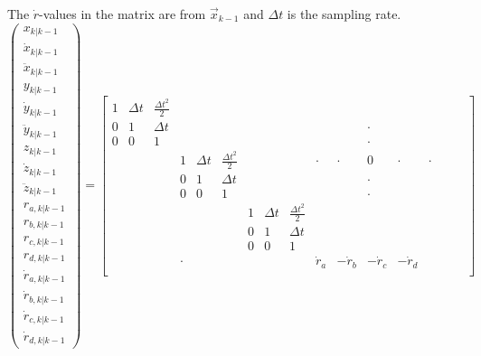 The $\dot{r}$-values in the matrix are from $\vec{x}_{k-1}$ and $\Delta t$ is the sampling rate.
\begin{equation*}
    \begin{pmatrix}
        x_{k|k-1}\\
        \dot{x}_{k|k-1}\\
        \ddot{x}_{k|k-1}\\
        y_{k|k-1}\\
        \dot{y}_{k|k-1}\\
        \ddot{y}_{k|k-1}\\
        z_{k|k-1}\\
        \dot{z}_{k|k-1}\\
        \ddot{z}_{k|k-1}\\
        r_{a,k|k-1}\\
        r_{b,k|k-1}\\
        r_{c,k|k-1}\\
        r_{d,k|k-1}\\
        \dot{r}_{a,k|k-1}\\
        \dot{r}_{b,k|k-1}\\
        \dot{r}_{c,k|k-1}\\
        \dot{r}_{d,k|k-1}
    \end{pmatrix} = 
    \begin{bmatrix}
        1 & \Delta t & \frac{\Delta t^{2}}{2} &  &  &  &  &  &  &  &  &  & & &  &  &  \\
        0 & 1 & \Delta t & &  &  &  &  &  &  &  & \cdot &  &  &  &  &  \\
        0 & 0 & 1 &  &  &  &  &  &  &  &  & \cdot &  &  &  &  &  \\
         &  &  & 1 & \Delta t & \frac{\Delta t^{2}}{2} &  &  &  & \cdot & \cdot & 0 & \cdot & \cdot &  &  &  \\
         &  &  & 0 & 1 & \Delta t &  &  &  &  &  & \cdot &  &  &  & &  \\
         &  &  & 0 & 0 & 1 &  &  &  &  &  & \cdot &  &  &  &  &  \\
         &  &  &  &  &  & 1 & \Delta t & \frac{\Delta t^{2}}{2} &  &  &  &  &  &  &  &  \\
         &  &  &  &  &  & 0 & 1 & \Delta t &  &  &  &  &  &  &  &  \\
         &  &  &  &  &  & 0 & 0 & 1 &  &  &  &  &  &  &  &  \\
         &  &  & \cdot &  &  &  &  &  & \dot{r}_{a} & -\dot{r}_{b} & -\dot{r}_{c} & -\dot{r}_{d} &  &  &  &  \\

\end{bmatrix}
\end{equation*}
